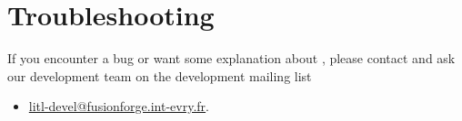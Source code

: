 
    
\chapter{Troubleshooting}
If you encounter a bug or want some explanation about \litl{}, please contact 
and ask our development team on the development mailing list
\begin{itemize}
 \item \url{litl-devel@fusionforge.int-evry.fr}.
\end{itemize}



\cleardoublepage
{}
{}
\small

\normalsize


